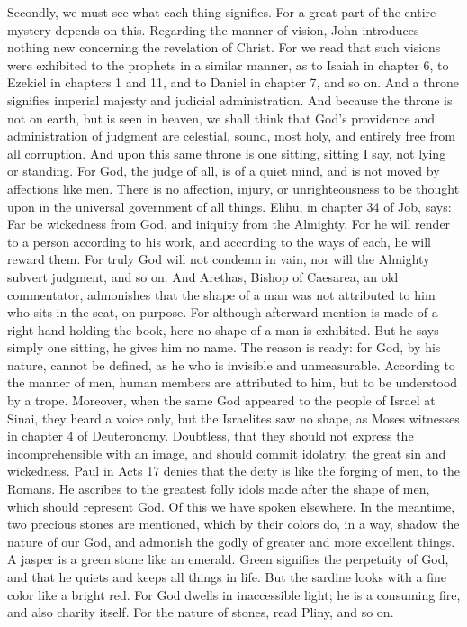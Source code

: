 Secondly, we must see what each thing signifies. For a great part of the entire mystery depends on this. Regarding the manner of vision, John introduces nothing new concerning the revelation of Christ. For we read that such visions were exhibited to the prophets in a similar manner, as to Isaiah in chapter 6, to Ezekiel in chapters 1 and 11, and to Daniel in chapter 7, and so on. And a throne signifies imperial majesty and judicial administration. And because the throne is not on earth, but is seen in heaven, we shall think that God’s providence and administration of judgment are celestial, sound, most holy, and entirely free from all corruption. And upon this same throne is one sitting, sitting I say, not lying or standing. For God, the judge of all, is of a quiet mind, and is not moved by affections like men. There is no affection, injury, or unrighteousness to be thought upon in the universal government of all things. Elihu, in chapter 34 of Job, says: Far be wickedness from God, and iniquity from the Almighty. For he will render to a person according to his work, and according to the ways of each, he will reward them. For truly God will not condemn in vain, nor will the Almighty subvert judgment, and so on. And Arethas, Bishop of Caesarea, an old commentator, admonishes that the shape of a man was not attributed to him who sits in the seat, on purpose. For although afterward mention is made of a right hand holding the book, here no shape of a man is exhibited. But he says simply one sitting, he gives him no name. The reason is ready: for God, by his nature, cannot be defined, as he who is invisible and unmeasurable. According to the manner of men, human members are attributed to him, but to be understood by a trope. Moreover, when the same God appeared to the people of Israel at Sinai, they heard a voice only, but the Israelites saw no shape, as Moses witnesses in chapter 4 of Deuteronomy. Doubtless, that they should not express the incomprehensible with an image, and should commit idolatry, the great sin and wickedness. Paul in Acts 17 denies that the deity is like the forging of men, to the Romans. He ascribes to the greatest folly idols made after the shape of men, which should represent God. Of this we have spoken elsewhere. In the meantime, two precious stones are mentioned, which by their colors do, in a way, shadow the nature of our God, and admonish the godly of greater and more excellent things. A jasper is a green stone like an emerald. Green signifies the perpetuity of God, and that he quiets and keeps all things in life. But the sardine looks with a fine color like a bright red. For God dwells in inaccessible light; he is a consuming fire, and also charity itself. For the nature of stones, read Pliny, and so on.

